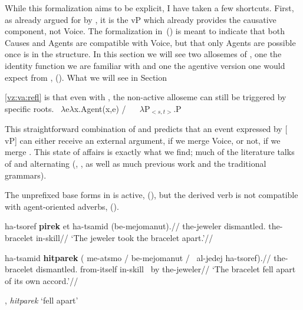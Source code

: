 While this formalization aims to be explicit, I have taken a few shortcuts. First, as already argued for by \cite{layering15}, it is the vP which already provides the causative component, not Voice. The formalization in~(\lastx) is meant to indicate that both Causes and Agents are compatible with Voice, but that only Agents are possible once {\va} is in the structure. In this section we will see two allosemes of {\vz}, one the identity function we are familiar with and one the agentive version one would expect from {\va}, (\nextx). What we will see in Section~{\ref{vz:va:refl} is that even with {\va}, the non-active alloseme can still be triggered by specific roots.
\pex 
	\a \denote{\vz} \lra~$\lambda$e$\lambda$x.Agent(x,e) / \trace~\va
	\a \denote{\vz} \lra~$\lambda$P$_{<s,t>}$.P
\xe

This straightforward combination of {\va} and {\vz} predicts that an event expressed by [{\va} vP] can either receive an external argument, if we merge Voice, or not, if we merge {\vz}. This state of affairs is exactly what we find; much of the literature talks of {\tpie} and {\thit} alternating (\citealt{doron03}, \citealt{arad05}, as well as much previous work and the traditional grammars).

The unprefixed base forms in {\tpie} is active, (\nextx), but the derived verb is not compatible with agent-oriented adverbs, (\anextx).

\pex
	\a \begingl
	\gla ha-{ts}oref \textbf{pirek} et ha-{ts}amid (be-mejomanut).//
	\glb the-jeweler dismantled.  the-bracelet in-skill//
	\glft `The jeweler took the bracelet apart.'//
	\endgl
	\a 
\xe

\pex
	\a \begingl
	\gla ha-{ts}amid \textbf{hitparek} ({\cmark} me-a{ts}mo / {\xmark} be-mejomanut / {\xmark}~al-jedej ha-{ts}oref).//
	\glb the-bracelet dismantled. {} from-itself {} {} in-skill {} {\phantom{\xmark}}~by the-jeweler//
	\glft `The bracelet fell apart of its own accord.'//
	\endgl

	\a {\thit}, \emph{hitparek} `fell apart'\\
\xe


}
